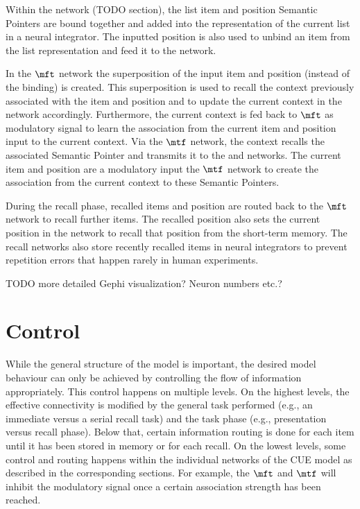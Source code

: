 Within the  network (TODO section), the list item and position Semantic Pointers are bound together and added into the representation of the current list in a neural integrator.
The inputted position is also used to unbind an item from the list representation and feed it to the  network.

In the $\mft$ network the superposition of the input item and position (instead of the binding) is created.
This superposition is used to recall the context previously associated with the item and position and to update the current context in the  network accordingly.
Furthermore, the current context is fed back to $\mft$ as modulatory signal to learn the association from the current item and position input to the current context.
Via the $\mtf$ network, the context recalls the associated Semantic Pointer and transmits it to the  and  networks.
The current item and position are a modulatory input the $\mtf$ network to create the association from the current context to these Semantic Pointers.

During the recall phase, recalled items and position are routed back to the $\mft$ network to recall further items.
The recalled position also sets the current position in the  network to recall that position from the  short-term memory.
The recall networks also store recently recalled items in neural integrators to prevent repetition errors that happen rarely in human experiments.


TODO more detailed Gephi visualization? Neuron numbers etc.?


\section{Control}
While the general structure of the model is important, the desired model behaviour can only be achieved by controlling the flow of information appropriately.
This control happens on multiple levels.
On the highest levels, the effective connectivity is modified by the general task performed (e.g., an immediate versus a serial recall task) and the task phase (e.g., presentation versus recall phase).
Below that, certain information routing is done for each item until it has been stored in memory or for each recall.
On the lowest levels, some control and routing happens within the individual networks of the CUE model as described in the corresponding sections.
For example, the $\mft$ and $\mtf$ will inhibit the modulatory signal once a certain association strength has been reached.

